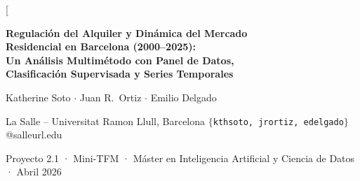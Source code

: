 \documentclass[10pt,a4paper,twocolumn]{article}
\begin{document}

\twocolumn[{%
\begin{@twocolumnfalse}

\begin{center}
  {\LARGE\bfseries
   Regulación del Alquiler y Dinámica del Mercado\\[4pt]
   Residencial en Barcelona (2000--2025):\\[4pt]
   Un Análisis Multimétodo con Panel de Datos,\\[4pt]
   Clasificación Supervisada y Series Temporales}

  \vspace{8pt}

  {\large
   Katherine Soto \quad $\cdot$ \quad Juan R.\ Ortiz \quad $\cdot$ \quad Emilio Delgado}

  \vspace{3pt}
  {\normalsize La Salle -- Universitat Ramon Llull, Barcelona \quad
   $\{$\texttt{kthsoto, jrortiz, edelgado}$\}$@salleurl.edu}

  \vspace{3pt}
  {\small Proyecto 2.1 · Mini-TFM · Máster en Inteligencia Artificial y Ciencia de Datos · Abril 2026}
\end{center}

\vspace{6pt}

\begin{abstract}
\noindent
Presentamos un análisis cuantitativo del mercado de alquiler residencial de Barcelona
durante el período 2000--2025 (103 trimestres), caracterizado por tres ciclos regulatorios
sucesivos: Ley 11/2020, derogación del Tribunal Constitucional (2022) y Ley 12/2023.
Empleamos cuatro métodos complementarios sobre datos oficiales de 10~distritos y
66~barrios: \textit{(i)}~regresión de panel con efectos fijos (\textit{within}, $N{=}2.838$
observaciones barrio-trimestre); \textit{(ii)}~clasificación supervisada de episodios
de tensión contractual (Random Forest, Gradient Boosting y Regresión Logística);
\textit{(iii)}~modelos SARIMAX$(1,1,1)(1,0,1)_4$ con análisis de intervención ITS-3
sobre 30 combinaciones distrito$\times$métrica; y \textit{(iv)}~los mismos modelos
sobre la serie ciudad en tres métricas: precio nominal, precio real (base~2025) y
volumen de contratos. El ITS-3 revela que la Ley~12/2023 produce una caída estructural
en contratos ($\hat{\beta}_{D_{12}}{=}{-}1.588$, $p{=}0.007$) y un incremento
paradójico del precio real ($+0.495$\,\euro/m$^2$, $p{=}0.034$), coherente con
el efecto composición documentado en la literatura internacional. El SARIMAX alcanza
un MAPE del $3.3\,\%$ en precio nominal ciudad.
\end{abstract}


\end{@twocolumnfalse}}
\end{document}
